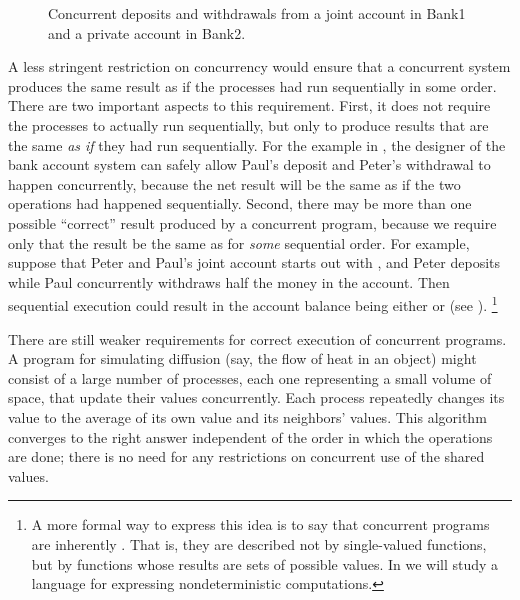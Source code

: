 \begin{figure}[tb]
	\centering
	
	\caption{
		Concurrent deposits and withdrawals from a joint account in Bank1 and a private account in Bank2.
	}
	\label{Figure 3.30}
\end{figure}

A less stringent restriction on concurrency would ensure that a concurrent system produces the same result as if the processes had run sequentially in some order.
There are two important aspects to this requirement.
First, it does not require the processes to actually run sequentially, but only to produce results that are the same \emph{as if} they had run sequentially.
For the example in , the designer of the bank account system can safely allow Paul’s deposit and Peter’s withdrawal to happen concurrently, because the net result will be the same as if the two operations had happened sequentially.
Second, there may be more than one possible “correct” result produced by a concurrent program, because we require only that the result be the same as for \emph{some} sequential order.
For example, suppose that Peter and Paul’s joint account starts out with , and Peter deposits  while Paul concurrently withdraws half the money in the account.
Then sequential execution could result in the account balance being either  or  (see ).%
\footnote{
	\label{Footnote 39} A more formal way to express this idea is to say that concurrent programs are inherently .
	That is, they are described not by single-valued functions, but by functions whose results are sets of possible values.
	In  we will study a language for expressing nondeterministic computations.
}

There are still weaker requirements for correct execution of concurrent programs.
A program for simulating diffusion (say, the flow of heat in an object) might consist of a large number of processes, each one representing a small volume of space, that update their values concurrently.
Each process repeatedly changes its value to the average of its own value and its neighbors’ values.
This algorithm converges to the right answer independent of the order in which the operations are done;
there is no need for any restrictions on concurrent use of the shared values.



